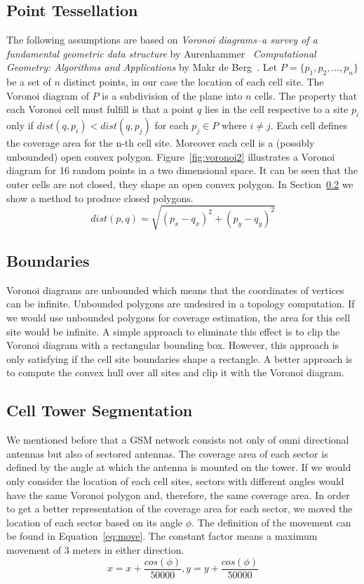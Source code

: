 \documentclass[master,english]{hgbthesis}
\begin{document}
\subsection{Point Tessellation}
The following assumptions are based on \emph{Voronoi diagrams--a survey of a fundamental geometric data structure} by Aurenhammer~\cite{Aurenhammer1991} \emph{Computational Geometry: Algorithms and Applications} by Makr de Berg~\cite{Berg2000}.
Let $P=\{p_1,p_2,...,p_n\}$ be a set of $n$ distinct points, in our case the location of each cell site. The Voronoi diagram of $P$ is a subdivision of the plane into $n$ cells. The property that each Voronoi cell must fulfill is that a point $q$ lies in the cell respective to a site $p_i$ only if $dist\left(q,p_i\right) < dist\left(q,p_j\right)$ for each $p_j \in P$ where $i \neq j$. Each cell defines the coverage area for the n-th cell site. Moreover each cell is a (possibly unbounded) open convex polygon. Figure~\ref{fig:voronoi2} illustrates a Voronoi diagram for 16 random points in a two dimensional space. It can be seen that the outer cells are not closed, they shape an open convex polygon. In Section~\ref{sec:boundaries} we show a method to produce closed polygons.
\begin{equation}
	dist(p,q)=\sqrt{\left(p_x-q_x\right)^2+\left(p_y-q_y\right)^2}
\end{equation}
\subsection{Boundaries}
\label{sec:boundaries}
Voronoi diagrams are unbounded which means that the coordinates of vertices can be infinite. Unbounded polygons are undesired in a topology computation. If we would use unbounded polygons for coverage estimation, the area for this cell site would be infinite. A simple approach to eliminate this effect is to clip the Voronoi diagram with a rectangular bounding box. However, this approach is only satisfying if the cell site boundaries shape a rectangle. A better approach is to compute the convex hull over all sites and clip it with the Voronoi diagram.
\subsection{Cell Tower Segmentation}
We mentioned before that a GSM network consists not only of omni directional antennas but also of sectored antennas. The coverage area of each sector is defined by the angle at which the antenna is mounted on the tower. If we would only consider the location of each cell sites, sectors with different angles would have the same Voronoi polygon and, therefore, the same coverage area. In order to get a better representation of the coverage area for each sector, we moved the location of each sector based on its angle $\phi$. The definition of the movement can be found in Equation~\ref{eq:move}. The constant factor means a maximum movement of 3 meters in either direction.
\begin{equation}
	\label{eq:move}
	x=x+\frac{cos(\phi)}{50000},y=y+\frac{cos(\phi)}{50000}
\end{equation}
\end{document}
